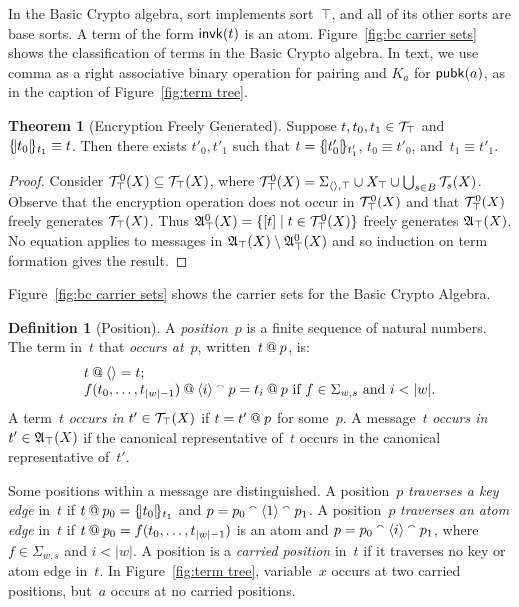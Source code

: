 \documentclass[12pt]{article}
\theoremstyle{definition}
\newtheorem{defn}{Definition}[section]
\newtheorem{thm}{Theorem}[section]
\begin{document}
In the Basic Crypto algebra, sort  implements sort~$\top$,
and all of its other sorts are base sorts.  A term of the form
$\operatorname{\mathsf{invk}}(t)$ is an atom.  Figure~\ref{fig:bc carrier sets} shows the
classification of terms in the Basic Crypto algebra.  In text, we use
comma as a right associative binary operation for pairing and $K_a$
for $\operatorname{\mathsf{pubk}}(a)$, as in the caption of Figure~\ref{fig:term tree}.

\begin{thm}[Encryption Freely Generated]\label{thm:encryption}
Suppose $t,t_0,t_1\in\mathcal{T}_\top$ and $\{\!|t_0|\!\}_{t_1}\equiv t$.  Then
there exists $t'_0,t'_1$ such that $t=\{\!|t'_0|\!\}_{t'_1}$, $t_0\equiv
t'_0$, and~$t_1\equiv t'_1$.
\end{thm}
\begin{proof}
Consider $\mathcal{T}^0_\top(X)\subseteq \mathcal{T}_\top(X)$, where
$\mathcal{T}^0_\top(X)=\Sigma_{\langle\rangle,\top}\cup X_\top\cup\bigcup_{s\in
  B}\mathcal{T}_s(X)$.  Observe that the encryption operation does not
occur in $\mathcal{T}^0_\top(X)$ and that $\mathcal{T}^0_\top(X)$ freely
generates $\mathcal{T}_\top(X)$. Thus $\mathfrak A^0_\top(X)=\{[t]\mid t\in
\mathcal{T}^0_\top(X)\}$ freely generates $\mathfrak A_\top(X)$.  No equation
applies to messages in $\mathfrak A_\top(X)\setminus\mathfrak A^0_\top(X)$ and
so induction on term formation gives the result.
\end{proof}

Figure~\ref{fig:bc carrier sets} shows the carrier sets for the Basic
Crypto Algebra.

\begin{defn}[Position]\label{defn:position}
A \emph{position}~$p$ is a finite sequence of natural numbers.  The
term in~$t$ that \emph{occurs at}~$p$, written~$t\mathbin{@} p$, is:
$$\begin{array}{l}
t\termat\seq{}=t;\\
f(t_0,\ldots,t_{|w|-1})\termat\seq{i}\append p=
t_i\termat p\mbox{ if }f\in\Sigma_{w,s}\mbox{ and }i<|w|.
\end{array}$$
A term~$t$ \emph{occurs in} $t'\in\mathcal{T}_\top(X)$ if $t=t'\mathbin{@} p$
for some~$p$.  A message~$t$ \emph{occurs in} $t'\in\mathfrak A_\top(X)$
if the canonical representative of~$t$ occurs in the canonical
representative of~$t'$.
\end{defn}

Some positions within a message are distinguished.  A position~$p$
\emph{traverses a key edge} in~$t$ if $t\mathbin{@} p_0=\{\!|t_0|\!\}_{t_1}$
and $p=p_0\mathbin{{}^\smallfrown}\langle1\rangle\mathbin{{}^\smallfrown} p_1$.  A position~$p$ \emph{traverses
  an atom edge} in~$t$ if $t\mathbin{@} p_0=f(t_0,\ldots,t_{|w|-1})$ is an
atom and $p=p_0\mathbin{{}^\smallfrown}\langle i\rangle\mathbin{{}^\smallfrown} p_1$, where $f\in\Sigma_{w,s}$
and $i<|w|$.  A position is a \emph{carried position} in~$t$ if it traverses no key or atom edge in~$t$.  In
Figure~\ref{fig:term tree}, variable~$x$ occurs at two carried
positions, but~$a$ occurs at no carried positions.
\end{document}
